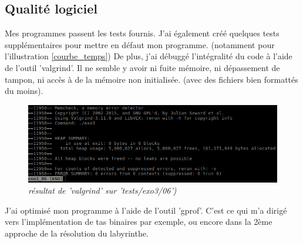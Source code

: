\documentclass[10pt]{article}
\begin{document}
		\subsection{Qualité logiciel}
			Mes programmes passent les tests fournis. J'ai également créé quelques tests supplémentaires pour mettre en défaut mon programme.
			(notamment pour l'illustration \ref{courbe_temps})\newline
			De plus, j'ai débuggé l'intégralité du code à l'aide de l'outil 'valgrind'.
			Il ne semble y avoir ni fuite mémoire, ni dépassement de tampon, ni accès à de la mémoire non initialisée.
			(avec des fichiers bien formattés du moins).
			\begin{figure}[H]
				\begin{center}
					\includegraphics[width=12cm,height=\textheight,keepaspectratio]{./images/valgrind.png}
				\end{center}
				\caption{\textit{résultat de 'valgrind' sur 'tests/exo3/06')}}
			\end{figure}
			J'ai optimisé mon programme à l'aide de l'outil 'gprof'.
			C'est ce qui m'a dirigé vers l'implémentation de tas binaires par exemple,
			ou encore dans la 2ème approche de la résolution du labyrinthe.

	\newpage
\end{document}

